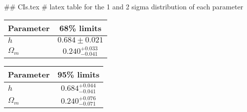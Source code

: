 ## CIs.tex
# latex table for the 1 and 2 sigma distribution of each parameter

\begin{tabular} { l  c}
 Parameter &  68\% limits\\
\hline
{\boldmath$h              $} & $0.684\pm 0.021            $\\
{\boldmath$\Omega_m       $} & $0.240^{+0.033}_{-0.041}   $\\
\hline
\end{tabular}

\begin{tabular} { l  c}
 Parameter &  95\% limits\\
\hline
{\boldmath$h              $} & $0.684^{+0.044}_{-0.041}   $\\
{\boldmath$\Omega_m       $} & $0.240^{+0.076}_{-0.071}   $\\
\hline
\end{tabular}
